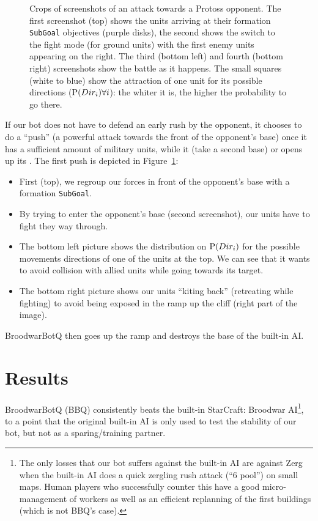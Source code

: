 \begin{figure}[h]
\begin{center}
\caption{Crops of screenshots of an attack towards a Protoss opponent. The first screenshot (top) shows the units arriving at their formation \texttt{SubGoal} objectives (purple disks), the second shows the switch to the fight mode (for ground units) with the first enemy units appearing on the right. The third (bottom left) and fourth (bottom right) screenshots show the battle as it happens. The small squares (white to blue) show the attraction of one unit for its possible directions ($\mathrm{P}(Dir_i) \forall i$): the whiter it is, the higher the probability to go there.}
\label{fig:bot_attack}
\end{center}
\end{figure}

If our bot does not have to defend an early rush by the opponent, it chooses to do a ``push'' (a powerful attack towards the front of the opponent's base) once it has a sufficient amount of military units, while it  (take a second base) or opens up its . The first push is depicted in Figure~\ref{fig:bot_attack}: 
\begin{itemize}
    \item First (top), we regroup our forces in front of the opponent's base with a formation \texttt{SubGoal}.
    \item By trying to enter the opponent's base (second screenshot), our units have to fight they way through.
    \item The bottom left picture shows the distribution on $\mathrm{P}(Dir_i)$ for the possible movements directions of one of the units at the top. We can see that it wants to avoid collision with allied units while going towards its target.
    \item The bottom right picture shows our units ``kiting back'' (retreating while fighting) to avoid being exposed in the ramp up the cliff (right part of the image).
\end{itemize}
BroodwarBotQ then goes up the ramp and destroys the base of the built-in AI.


\section{Results}

BroodwarBotQ (BBQ) consistently beats the built-in StarCraft: Broodwar AI\footnote{The only losses that our bot suffers against the built-in AI are against Zerg when the built-in AI does a quick zergling rush attack (``6 pool'') on small maps. Human players who successfully counter this have a good micro-management of workers as well as an efficient replanning of the first buildings (which is not BBQ's case).}, to a point that the original built-in AI is only used to test the stability of our bot, but not as a sparing/training partner.

